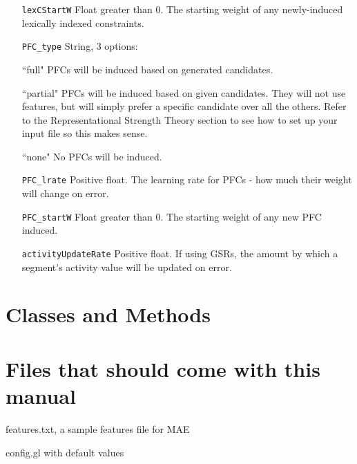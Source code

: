 \documentclass[12]{article}
\begin{document}
\begin{itemize}
	\item[\texttt{lexCStartW}] Float greater than 0.  The starting weight of any newly-induced lexically indexed constraints.
	
	\item[\texttt{PFC\_type}] String, 3 options:
	
	``full" PFCs will be induced based on generated candidates.
	
	``partial" PFCs will be induced based on given candidates.  They will not use features, but will simply prefer a specific candidate over all the others.  Refer to the Representational Strength Theory section to see how to set up your input file so this makes sense.
	
	``none" No PFCs will be induced.
	
	\item[\texttt{PFC\_lrate}]  Positive float.  The learning rate for PFCs - how much their weight will change on error.

	\item[\texttt{PFC\_startW}]	Float greater than 0.  The starting weight of any new PFC induced.

	\item[\texttt{activityUpdateRate}]  Positive float.  If using GSRs, the amount by which a segment's activity value will be updated on error.
	
\end{itemize}




\section{Classes and Methods}

\section{Files that should come with this manual}
features.txt, a sample features file for MAE

config.gl with default values
\end{document}
